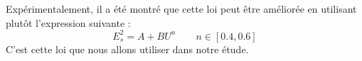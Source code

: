 \documentclass[12pt, a4paper]{report}
\begin{document}
	\noindent Expérimentalement, il a été montré que cette loi peut être améliorée en utilisant plutôt l'expression suivante :
	\begin{equation*}
		\boxed{E_s^2 = A + B U^n} \qquad n \in [0.4, 0.6]
	\end{equation*}
	C'est cette loi que nous allons utiliser dans notre étude.
%	
%	
%
%		
%				
\end{document}
